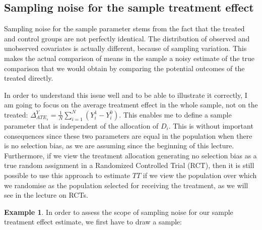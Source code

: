 \documentclass[
]{book}
\theoremstyle{definition}
\theoremstyle{definition}
\newtheorem{example}{Example}[chapter]
\theoremstyle{definition}
\theoremstyle{definition}
\theoremstyle{remark}
\begin{document}
\hypertarget{sec:illusnoisesamp}{%
\subsection{Sampling noise for the sample treatment effect}\label{sec:illusnoisesamp}}

Sampling noise for the sample parameter stems from the fact that the treated and control groups are not perfectly identical.
The distribution of observed and unobserved covariates is actually different, because of sampling variation.
This makes the actual comparison of means in the sample a noisy estimate of the true comparison that we would obtain by comparing the potential outcomes of the treated directly.

In order to understand this issue well and to be able to illustrate it correctly, I am going to focus on the average treatment effect in the whole sample, not on the treated: \(\Delta^Y_{ATE_s}=\frac{1}{N}\sum_{i=1}^N(Y_i^1-Y_i^0)\).
This enables me to define a sample parameter that is independent of the allocation of \(D_i\).
This is without important consequences since these two parameters are equal in the population when there is no selection bias, as we are assuming since the beginning of this lecture.
Furthermore, if we view the treatment allocation generating no selection bias as a true random assignment in a Randomized Controlled Trial (RCT), then it is still possible to use this approach to estimate \(TT\) if we view the population over which we randomise as the population selected for receiving the treatment, as we will see in the lecture on RCTs.

\begin{example}
\protect\hypertarget{exm:unnamed-chunk-34}{}{\label{exm:unnamed-chunk-34} }In order to assess the scope of sampling noise for our sample treatment effect estimate, we first have to draw a sample:
\end{example}
\end{document}
